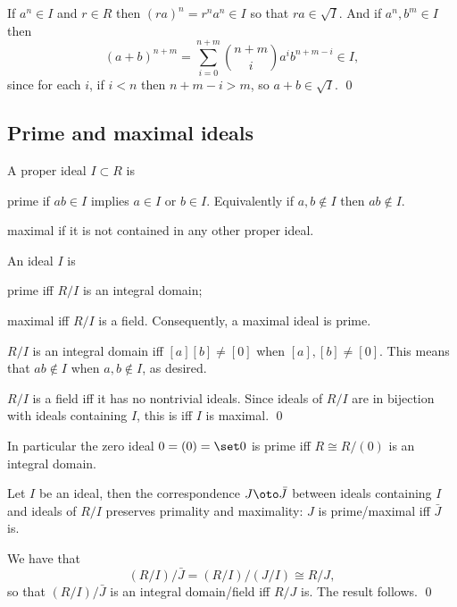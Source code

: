 \elemm

\bproof

    If $a^n\in I$ and $r\in R$ then $(ra)^n=r^na^n\in I$ so that $ra\in\sqrt I$.
    And if $a^n,b^m\in I$ then
    $$ (a+b)^{n+m} = \sum_{i=0}^{n+m}\binom{n+m}i a^ib^{n+m-i} \in I , $$
    since for each $i$, if $i<n$ then $n+m-i>m$, so $a+b\in\sqrt I$.
    \qed

\eproof

\subsection{Prime and maximal ideals}

\bdefn

    A proper ideal $I\subset R$ is
    \benum
        \item {\emphcolor prime} if $ab\in I$ implies $a\in I$ or $b\in I$.
        Equivalently if $a,b\notin I$ then $ab\notin I$.
        \item {\emphcolor maximal} if it is not contained in any other proper ideal.
    \eenum

\edefn

\bprop

    An ideal $I$ is
    \benum
        \item prime iff $R/I$ is an integral domain;
        \item maximal iff $R/I$ is a field.
    \eenum
    Consequently, a maximal ideal is prime.

\eprop

\bproof

    $R/I$ is an integral domain iff $[a][b]\neq[0]$ when $[a],[b]\neq[0]$.
    This means that $ab\notin I$ when $a,b\notin I$, as desired.

    $R/I$ is a field iff it has no nontrivial ideals.
    Since ideals of $R/I$ are in bijection with ideals containing $I$, this is iff $I$ is maximal.
    \qed

\eproof

In particular the zero ideal $0=(0)=\set0$ is prime iff $R\cong R/(0)$ is an integral domain.

\bcoro

    Let $I$ be an ideal, then the correspondence $J\oto\bar J$ between ideals containing $I$ and ideals of $R/I$
    preserves primality and maximality: $J$ is prime/maximal iff $\bar J$ is.

\ecoro

\bproof

    We have that
    $$ (R/I)/\bar J = (R/I)/(J/I) \cong R/J , $$
    so that $(R/I)/\bar J$ is an integral domain/field iff $R/J$ is.
    The result follows.
    \qed

